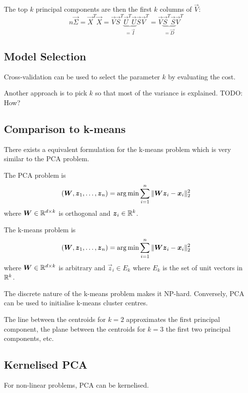 The top $k$ principal components are then the first $k$
columns of $\vec{V}$:
\begin{equation*}
    n \vec{\Sigma}
    = \vec{X}^T \vec{X}
    = \vec{V} \vec{S}^T \underbrace{\vec{U}^T \vec{U}}_{=\vec{I}} \vec{S} \vec{V}^T
    = \vec{V} \underbrace{\vec{S}^T \vec{S}}_{= \vec{D}} \vec{V}^T
\end{equation*}


\subsection{Model Selection}
Cross-validation can be used to select the parameter $k$
by evaluating the cost.

Another approach is to pick $k$ so that most of the variance
is explained.
TODO: How?


\subsection{Comparison to k-means}
There exists a equivalent formulation for the k-means problem
which is very similar to the PCA problem.

The PCA problem is
\begin{equation*}
    (\boldsymbol{W}, \boldsymbol{z}_1, \dotsc, \boldsymbol{z}_n) = \arg\min{
        \sum_{i=1}^n{\lVert\boldsymbol{W} \boldsymbol{z}_i - \boldsymbol{x}_i\rVert_2^2}
    }
\end{equation*}
where $\boldsymbol{W} \in \mathbb{R}^{d \times k}$ is orthogonal and
$\boldsymbol{z}_i \in \mathbb{R}^k$.

The k-means problem is
\begin{equation*}
    (\boldsymbol{W}, \boldsymbol{z}_1, \dotsc, \boldsymbol{z}_n) = \arg\min{
        \sum_{i=1}^n{\lVert\boldsymbol{W} \boldsymbol{z}_i - \boldsymbol{x}_i\rVert_2^2}
    }
\end{equation*}
where $\boldsymbol{W} \in \mathbb{R}^{d \times k}$ is arbitrary and
$\vec{z}_i \in E_k$ where $E_k$ is the set of unit vectors
in $\mathbb{R}^k$.

The discrete nature of the k-means problem makes it NP-hard.
Conversely, PCA can be used to initialise k-means cluster centres.

The line between the centroids for $k=2$ approximates
the first principal component,
the plane between the centroids for $k=3$ the first
two principal components, etc.


\subsection{Kernelised PCA}
For non-linear problems, PCA can be kernelised.

